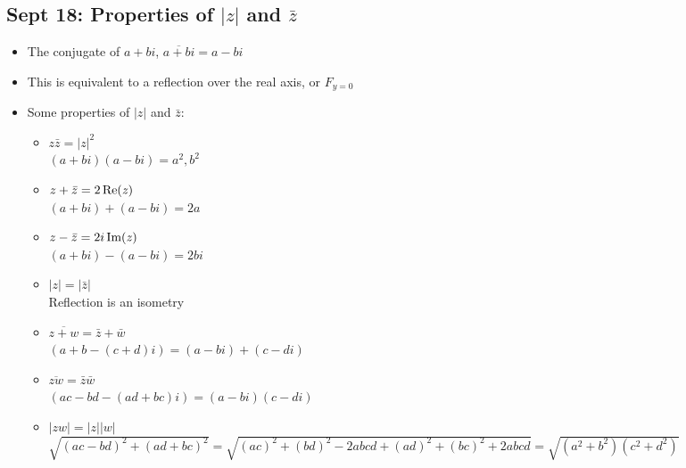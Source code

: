\documentclass[10pt, oneside]{article}
\begin{document}
\subsection{Sept 18: Properties of $|z|$ and $\bar{z}$}
\begin{itemize}
    \item The conjugate of $a + bi$, $\overline{a + bi} = a - bi$
    \item This is equivalent to a reflection over the real axis, or $F_{y=0}$
    \item Some properties of  $|z|$ and $\bar{z}$:
    \begin{itemize}
        \item $z \bar{z} = |z|^2$\\
        $(a + bi)(a - bi) = a^2,b^2$
        \item $z + \bar{z} = 2 \, \rm Re \it (z)$\\
        $(a + bi) + (a - bi) = 2a$
        \item $z - \bar{z} = 2i \, \rm Im \it (z)$\\
        $(a + bi) - (a - bi) = 2bi$
        \item $|z| = |\bar{z}|$\\
        Reflection is an isometry
        \item $\overline{z + w} = \bar{z} + \bar{w}$\\
        $(a+b -(c+d)i) = (a - bi) + (c - di)$
        \item $\overline{zw} = \bar{z} \bar{w}$\\
        $(ac - bd - (ad + bc)i) = (a - bi)(c - di)$
        \item $|zw| = |z||w|$\\
        $\sqrt{(ac-bd)^2 + (ad+bc)^2} = \sqrt{(ac)^2 + (bd)^2 - 2abcd + (ad)^2 + (bc)^2 + 2abcd} = \sqrt{(a^2 + b^2)(c^2 + d^2)}$
    \end{itemize}
\end{itemize} 
\end{document}
